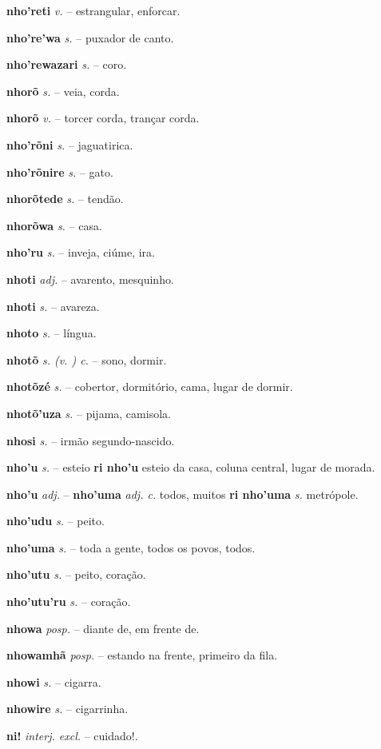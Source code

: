 \textbf{nho'reti} \textit{v.} -- estrangular, enforcar.

\textbf{nho're'wa} \textit{s.} -- puxador de canto.

\textbf{nho'rewazari} \textit{s.} -- coro.

\textbf{nhorõ} \textit{s.} -- veia, corda.

\textbf{nhorõ} \textit{v.} -- torcer corda, trançar corda.

\textbf{nho'rõni} \textit{s.} -- jaguatirica.

\textbf{nho'rõnire} \textit{s.} -- gato.

\textbf{nhorõtede} \textit{s.} -- tendão.

\textbf{nhorõwa} \textit{s.} -- casa.

\textbf{nho'ru} \textit{s.} -- inveja, ciúme, ira.

\textbf{nhoti} \textit{adj.} -- avarento, mesquinho.

\textbf{nhoti} \textit{s.} -- avareza.

\textbf{nhoto} \textit{s.} -- língua.

\textbf{nhotõ} \textit{s. (v. ) c.} -- sono, dormir.

\textbf{nhotõzé} \textit{s.} -- cobertor, dormitório, cama, lugar de dormir.

\textbf{nhotõ'uza} \textit{s.} -- pijama, camisola.

\textbf{nhosi} \textit{s.} -- irmão segundo-nascido.

\textbf{nho'u} \textit{s.} -- esteio  \textbf{ri nho'u} esteio da casa, coluna central, lugar de morada.

\textbf{nho'u} \textit{adj.} -- \textbf{nho'uma} \textit{adj. c.} todos, muitos  \textbf{ri nho'uma} \textit{s.} metrópole.

\textbf{nho'udu} \textit{s.} -- peito.

\textbf{nho'uma} \textit{s.} -- toda a gente, todos os povos, todos.

\textbf{nho'utu} \textit{s.} -- peito, coração.

\textbf{nho'utu'ru} \textit{s.} -- coração.

\textbf{nhowa} \textit{posp.} -- diante de, em frente de.

\textbf{nhowamhã} \textit{posp.} -- estando na frente, primeiro da fila.

\textbf{nhowi} \textit{s.} -- cigarra.

\textbf{nhowire} \textit{s.} -- cigarrinha.

\textbf{ni!} \textit{interj. excl.} -- cuidado!.


